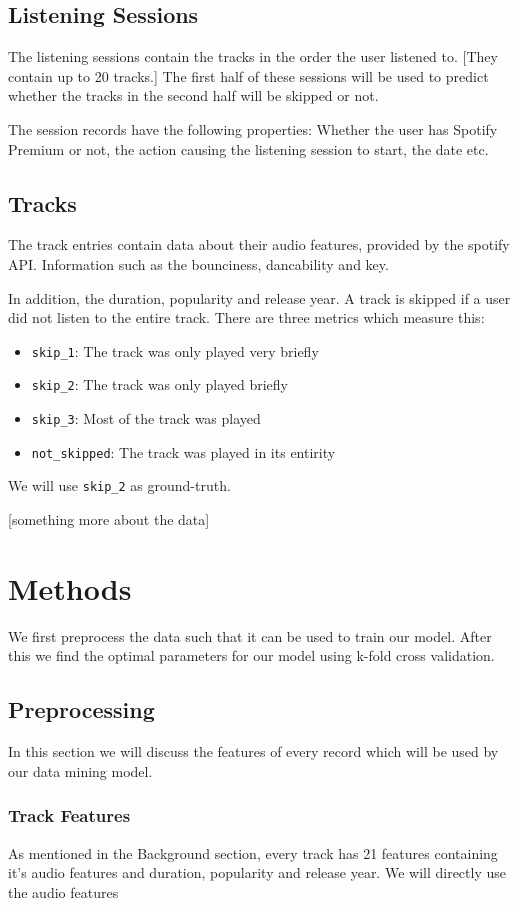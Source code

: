 \documentclass[conference]{IEEEtran}
\begin{document}
\subsection{Listening Sessions}
The listening sessions contain the tracks in the order the user listened to. [They contain up to 20 tracks.]
The first half of these sessions will be used to predict whether the tracks in the second half will be skipped or not. 

The session records have the following properties: 
Whether the user has Spotify Premium or not, 
the action causing the listening session to start, 
the date etc. 

\subsection{Tracks}
The track entries contain data about their audio features, 
provided by the spotify API\@. 
Information such as the bounciness, dancability and key.

In addition, the duration, popularity and release year.
A track is skipped if a user did not listen to the entire track. There are three metrics which measure this: 
\begin{itemize}
	\item \verb|skip_1|: The track was only played very briefly
	\item \verb|skip_2|: The track was only played briefly
	\item \verb|skip_3|: Most of the track was played
	\item \verb|not_skipped|: The track was played in its entirity
\end{itemize}
We will use \verb|skip_2| as ground-truth.

[something more about the data]

\section{Methods}
We first preprocess the data such that it can be used to train our model.
After this we find the optimal parameters for our model using k-fold cross validation.

\subsection{Preprocessing}
In this section we will discuss the features of every record which will be used by our data mining model.

\subsubsection{Track Features}
As mentioned in the Background section, every track has 21 features containing 
it's audio features and duration, popularity and release year. 
We will directly use the audio features
\end{document}
